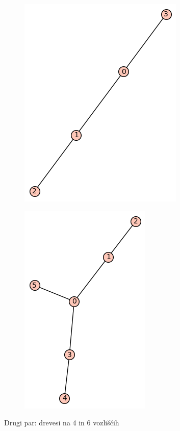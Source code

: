 \documentclass[12pt, a4paper]{article}
\begin{document}
\begin{center}
\begin{center}
\begin{figure}[!htb]
\centering
\begin{subfigure}{0.5\textwidth}
  \centering
  \includegraphics[width=0.4\linewidth]{t-3}
\end{subfigure}%
\begin{subfigure}{0.5\textwidth}
  \centering
  \includegraphics[width=0.5\linewidth]{t-11}
\end{subfigure}
\caption{Drugi par: drevesi na 4 in 6 vozliščih}
\label{fig:test}
\end{figure}
\end{center}


\end{center}
\end{document}
